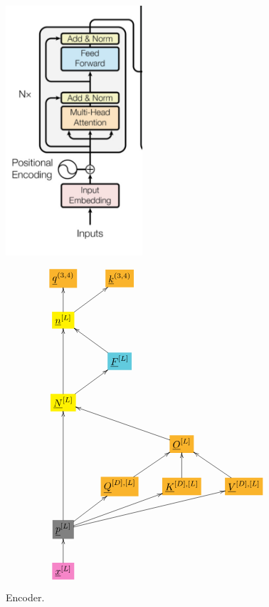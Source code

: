 \documentclass[12pt]{article}
\begin{document}
\begin{figure}[h!]\centering
\begin{minipage}{.5\linewidth}
\includegraphics[width=2in]{encoder.jpg}
\end{minipage}%
\begin{minipage}{.5\linewidth}
$$\xymatrix{
*+[F*:Dandelion]{\underline{q}^{(3, 4)}}&*+[F*:Dandelion]{\underline{k}^{(3, 4)}}&&
\\
*+[F*:yellow]{\underline{n}^{[L]}}\ar[u]\ar[ur]&&&
\\
&*+[F*:SkyBlue]{\underline{F}^{[L]}}\ar[ul]&&
\\
*+[F*:yellow]{\underline{N}^{[L]}}\ar[uu]\ar[ur]&&&
\\
&&*+[F*:Dandelion]{\underline{O}^{[L]}}\ar[ull]&
\\
&*+[F*:Dandelion]{\underline{Q}^{[D], [L]}}\ar[ur]&*+[F*:Dandelion]{\underline{K}^{[D], [L]}}\ar[u]&*+[F*:Dandelion]{\underline{V}^{[D],[L]}}\ar[ul]
\\
*+[F*:gray]{\underline{p}^{[L]}}\ar[uuu]\ar[ur]\ar[urr]\ar[urrr]&&&
\\
*+[F*:Lavender]{\underline{x}^{[L]}}\ar[u]&&&
}$$
\end{minipage}
\caption{Encoder.}
\label{fig-texnn-for-encoder}
\end{figure}
\end{document}

